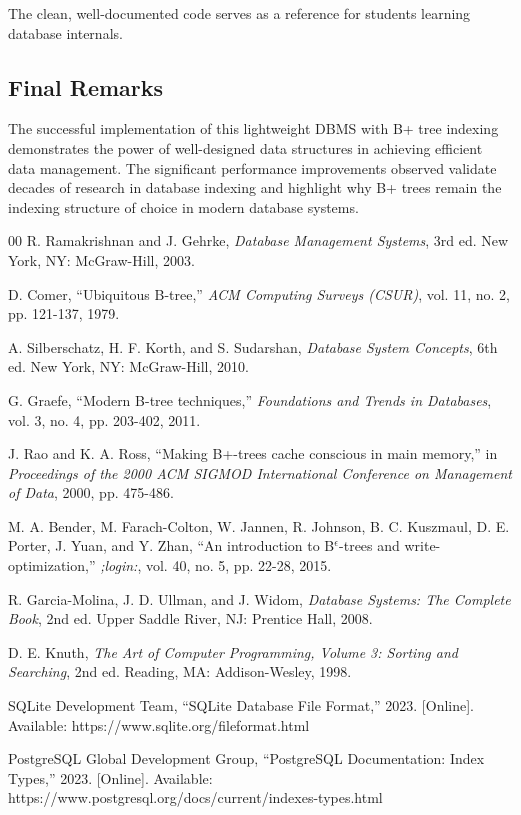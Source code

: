 \documentclass[conference]{IEEEtran}
\begin{document}
The clean, well-documented code serves as a reference for students learning database internals.

\subsection{Final Remarks}

The successful implementation of this lightweight DBMS with B+ tree indexing demonstrates the power of well-designed data structures in achieving efficient data management. The significant performance improvements observed validate decades of research in database indexing and highlight why B+ trees remain the indexing structure of choice in modern database systems.

\begin{thebibliography}{00}
 R. Ramakrishnan and J. Gehrke, \emph{Database Management Systems}, 3rd ed. New York, NY: McGraw-Hill, 2003.

 D. Comer, ``Ubiquitous B-tree,'' \emph{ACM Computing Surveys (CSUR)}, vol. 11, no. 2, pp. 121-137, 1979.

 A. Silberschatz, H. F. Korth, and S. Sudarshan, \emph{Database System Concepts}, 6th ed. New York, NY: McGraw-Hill, 2010.

 G. Graefe, ``Modern B-tree techniques,'' \emph{Foundations and Trends in Databases}, vol. 3, no. 4, pp. 203-402, 2011.

 J. Rao and K. A. Ross, ``Making B+-trees cache conscious in main memory,'' in \emph{Proceedings of the 2000 ACM SIGMOD International Conference on Management of Data}, 2000, pp. 475-486.

 M. A. Bender, M. Farach-Colton, W. Jannen, R. Johnson, B. C. Kuszmaul, D. E. Porter, J. Yuan, and Y. Zhan, ``An introduction to B$^\epsilon$-trees and write-optimization,'' \emph{;login:}, vol. 40, no. 5, pp. 22-28, 2015.

 R. Garcia-Molina, J. D. Ullman, and J. Widom, \emph{Database Systems: The Complete Book}, 2nd ed. Upper Saddle River, NJ: Prentice Hall, 2008.

 D. E. Knuth, \emph{The Art of Computer Programming, Volume 3: Sorting and Searching}, 2nd ed. Reading, MA: Addison-Wesley, 1998.

 SQLite Development Team, ``SQLite Database File Format,'' 2023. [Online]. Available: https://www.sqlite.org/fileformat.html

 PostgreSQL Global Development Group, ``PostgreSQL Documentation: Index Types,'' 2023. [Online]. Available: https://www.postgresql.org/docs/current/indexes-types.html
\end{thebibliography}

\vspace{12pt}
\end{document}
